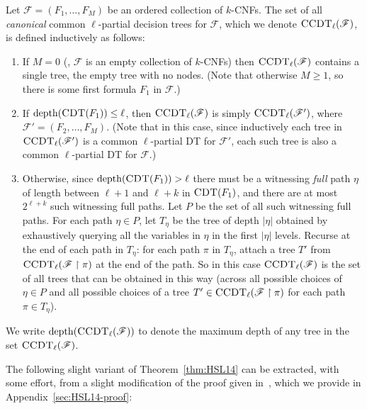 \documentclass{toc}
\theoremstyle{plain}
\newcommand{\uhr}{\upharpoonright}
\newcommand{\CDT}{\textsc{CDT}}
\newcommand{\CCDT}{\textsc{CCDT}}
\newcommand{\depth}{\mathrm{depth}}
\begin{document}
\begin{definition}
\label{def:ccpdt}
Let $\mathscr{F} = (F_1,\ldots,F_M)$ be an ordered collection of $k$-CNFs.  The set of all \emph{canonical} common $\ell$-partial decision trees for $\mathscr{F}$, which we denote $\CCDT_\ell(\mathscr{F})$, is defined inductively as follows: 
\begin{enumerate}

\item [0.] If $M=0$ (\ie, $\mathscr{F}$ is an empty collection of $k$-CNFs) then $\CCDT_\ell(\mathscr{F})$ contains a single tree, the empty tree with no nodes.  (Note that otherwise $M\geq 1$, so there is some first formula $F_1$ in $\mathscr{F}.$)

\item If $\depth(\CDT(F_1)) \le \ell$, then $\CCDT_\ell(\mathscr{F})$ is simply $\CCDT_\ell(\mathscr{F}')$, where $\mathscr{F}' = (F_2,\dots,F_M)$. (Note that in this case, since inductively each tree in $\CCDT_\ell(\mathscr{F}')$ is a common $\ell$-partial DT for $\mathscr{F}'$, each such tree is also a common $\ell$-partial DT for $\mathscr{F}$.)

\item Otherwise, since $\depth(\CDT(F_1)) > \ell$ there must be a witnessing {\emph{full}} path {$\eta$} of length {between $\ell+1$ and $\ell + k$} in $\CDT(F_1)$, and there are at most {$2^{\ell + k}$} such witnessing full paths. Let $P$ be the set of all such witnessing full paths.  For each path ${\eta} \in P$,  let $T_{\eta}$ be the tree of depth {$|\eta|$} obtained by exhaustively querying all the variables in {$\eta$} in the first {$|\eta|$} levels.  Recurse at the end of each path in $T_{{\eta}}$: for each path $\pi$ in $T_{{\eta}}$, attach a tree $T'$ from $\CCDT_\ell(\mathscr{F}\uhr \pi)$ at the end of the path.  So in this case $\CCDT_\ell(\mathscr{F})$ is the set of all trees that can be obtained in this way (across all possible choices of ${\eta} \in P$ and all possible choices of a tree $T' \in \CCDT_\ell(\mathscr{F}\uhr \pi)$ for each path $\pi \in T_{{\eta}}$).

\end{enumerate} 
We write $\depth(\CCDT_\ell(\mathscr{F}))$ to denote the maximum depth of any tree in the set 
$\CCDT_\ell(\mathscr{F})$.
\end{definition} 




The following slight variant of Theorem~\ref{thm:HSL14} can be extracted, with some effort, from a slight modification of the proof given in~\cite{Has14}, which we provide in Appendix~\ref{sec:HSL14-proof}: 
\end{document}

